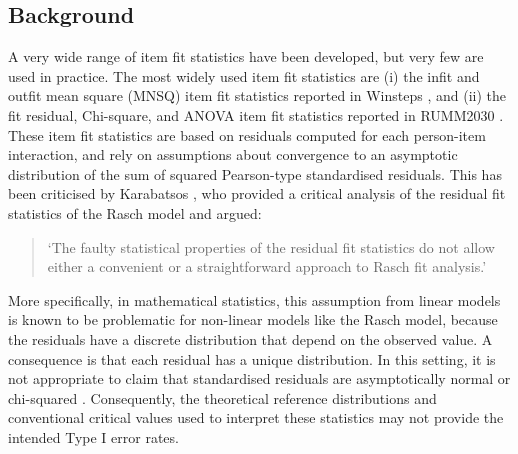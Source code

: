 \documentclass[11pt,a4paper]{article}
\begin{document}
\subsection{Background}

A very wide range of item fit statistics have been developed, but very few are used in practice. The most widely used item fit statistics are (i) the infit and outfit mean square (MNSQ) item fit statistics \cite{Wright-Stone-1979,Wright-Masters-1982} reported in Winsteps \cite{Linacre-2022}, and (ii) the fit residual, Chi-square, and ANOVA item fit statistics reported in RUMM2030 \cite{Andrich-Sheridan-Luo-et-al-2010}. These item fit statistics are based on residuals computed for each person-item interaction, and rely on assumptions about convergence to an asymptotic distribution of the sum of squared Pearson-type standardised residuals. This has been criticised by Karabatsos \cite{Karabatsos-2000}, who provided a critical analysis of the residual fit statistics of the Rasch model and argued:

\begin{quote}
`The faulty statistical properties of the residual fit statistics do not allow either a convenient or a straightforward approach to Rasch fit analysis.'
\end{quote}

More specifically, in mathematical statistics, this assumption from linear models is known to be problematic for non-linear models like the Rasch model, because the residuals have a discrete distribution that depend on the observed value. A consequence is that each residual has a unique distribution. In this setting, it is not appropriate to claim that standardised residuals are asymptotically normal or chi-squared \cite{Jennings-1986}. 
Consequently, the theoretical reference distributions and conventional critical values used to interpret these statistics may not provide the intended Type I error rates. 
\end{document}
